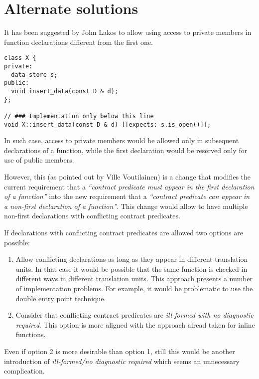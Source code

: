 \section{Alternate solutions}

It has been suggested by John Lakos to allow using access to private members in function
declarations different from the first one.

\begin{lstlisting}
class X {
private:
  data_store s;
public:
  void insert_data(const D & d);
};

// ### Implementation only below this line
void X::insert_data(const D & d) [[expects: s.is_open()]];
\end{lstlisting}

In such case, access to private members would be allowed only in subsequent
declarations of a function, while the first declaration would be reserved only
for use of public members.

However, this (as pointed out by Ville Voutilainen) is a change that modifies the
current requirement that a \emph{``contract predicate must appear in the first
declaration of a function''} into the new requirement that a \emph{``contract
predicate can appear in a non-first declaration of a function''}. This change
would allow to have multiple non-first declarations with conflicting contract
predicates.

If declarations with conflicting contract predicates are allowed two options are
possible:

\begin{enumerate}

\item Allow conflicting declarations as long as they appear in different
translation units. In that case it would be possible that the same function is
checked in different ways in different translation units. This approach presents
a number of implementation problems. For example, it would be problematic to use
the double entry point technique.

\item Consider that conflicting contract predicates are \emph{ill-formed with no
diagnostic required}. This option is more aligned with the approach alread taken
for inline functions.

\end{enumerate}

Even if option 2 is more desirable than option 1, still this would be another
introduction of \emph{ill-formed/no diagnostic required} which seems an
unnecessary complication.

